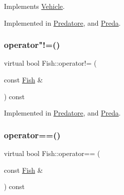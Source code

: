 Implements \hyperlink{classVehicle_a49a29a7ce993a33f78b96e7b368c60fd_a49a29a7ce993a33f78b96e7b368c60fd}{Vehicle}.



Implemented in \hyperlink{classPredatore_ab7cd03e843432d25ba88348a9733a186_ab7cd03e843432d25ba88348a9733a186}{Predatore}, and \hyperlink{classPreda_a4014c320e53abbfc7cbfb30f18791db2_a4014c320e53abbfc7cbfb30f18791db2}{Preda}.

\mbox{\label{classFish_aa739aa5c06ff6054b051047bccd3bf6f_aa739aa5c06ff6054b051047bccd3bf6f}} 
\subsubsection{\texorpdfstring{operator"!=()}{operator!=()}}
{\footnotesize\ttfamily virtual bool Fish\+::operator!= (\begin{DoxyParamCaption}\item[{const \hyperlink{classFish}{Fish} \&}]{ }\end{DoxyParamCaption}) const\hspace{0.3cm}{\ttfamily [pure virtual]}}



Implemented in \hyperlink{classPredatore_a26117f146fc2892877355788c5e5368e_a26117f146fc2892877355788c5e5368e}{Predatore}, and \hyperlink{classPreda_a69a59a55918bddb47457275763b2b352_a69a59a55918bddb47457275763b2b352}{Preda}.

\mbox{\label{classFish_a3abf96fe9cda276a4b3827464e2b0519_a3abf96fe9cda276a4b3827464e2b0519}} 
\subsubsection{\texorpdfstring{operator==()}{operator==()}}
{\footnotesize\ttfamily virtual bool Fish\+::operator== (\begin{DoxyParamCaption}\item[{const \hyperlink{classFish}{Fish} \&}]{ }\end{DoxyParamCaption}) const\hspace{0.3cm}{\ttfamily [pure virtual]}}



